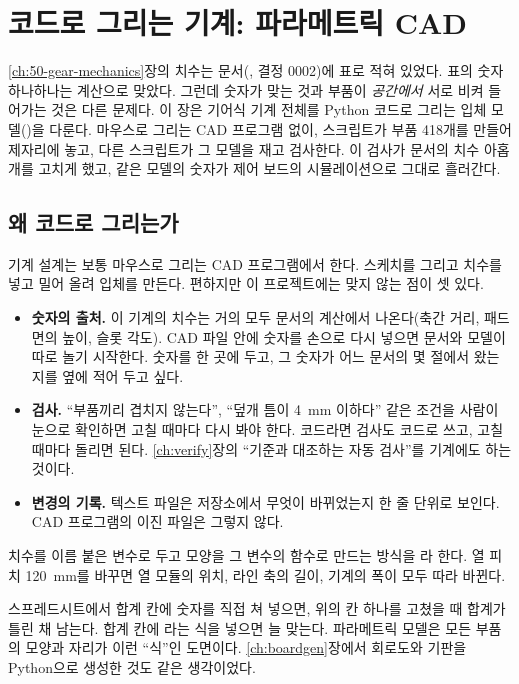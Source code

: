 \chapter{코드로 그리는 기계: 파라메트릭 CAD}\label{ch:51-gear-cad}

\ref{ch:50-gear-mechanics}장의 치수는 문서(, 결정 0002)에 표로 적혀 있었다. 표의 숫자 하나하나는 계산으로
맞았다. 그런데 숫자가 맞는 것과 부품이 \emph{공간에서} 서로 비켜 들어가는 것은 다른 문제다. 이 장은 기어식 기계 전체를
Python 코드로 그리는 입체 모델()을 다룬다. 마우스로 그리는 CAD 프로그램 없이, 스크립트가 부품
418개를 만들어 제자리에 놓고, 다른 스크립트가 그 모델을 재고 검사한다. 이 검사가 문서의 치수 아홉 개를 고치게 했고,
같은 모델의 숫자가 제어 보드의 시뮬레이션으로 그대로 흘러간다.

\section{왜 코드로 그리는가}\label{sec:gc-why}

\Why 기계 설계는 보통 마우스로 그리는 CAD 프로그램에서 한다. 스케치를 그리고 치수를 넣고 밀어 올려 입체를 만든다.
편하지만 이 프로젝트에는 맞지 않는 점이 셋 있다.

\begin{itemize}
\item \textbf{숫자의 출처.} 이 기계의 치수는 거의 모두 문서의 계산에서 나온다(축간 거리, 패드 면의 높이, 슬롯 각도).
CAD 파일 안에 숫자를 손으로 다시 넣으면 문서와 모델이 따로 놀기 시작한다. 숫자를 한 곳에 두고, 그 숫자가 어느 문서의
몇 절에서 왔는지를 옆에 적어 두고 싶다.
\item \textbf{검사.} ``부품끼리 겹치지 않는다'', ``덮개 틈이 4~mm 이하다'' 같은 조건을 사람이 눈으로 확인하면 고칠 때마다
다시 봐야 한다. 코드라면 검사도 코드로 쓰고, 고칠 때마다 돌리면 된다. \ref{ch:verify}장의 ``기준과 대조하는 자동
검사''를 기계에도 하는 것이다.
\item \textbf{변경의 기록.} 텍스트 파일은 저장소에서 무엇이 바뀌었는지 한 줄 단위로 보인다. CAD 프로그램의 이진 파일은
그렇지 않다.
\end{itemize}

치수를 이름 붙은 변수로 두고 모양을 그 변수의 함수로 만드는 방식을 라 한다.
열 피치 120~mm를 바꾸면 열 모듈의 위치, 라인 축의 길이, 기계의 폭이 모두 따라 바뀐다.

\General 스프레드시트에서 합계 칸에 숫자를 직접 쳐 넣으면, 위의 칸 하나를 고쳤을 때 합계가 틀린 채 남는다. 합계 칸에
라는 식을 넣으면 늘 맞는다. 파라메트릭 모델은 모든 부품의 모양과 자리가 이런 ``식''인 도면이다.
\ref{ch:boardgen}장에서 회로도와 기판을 Python으로 생성한 것도 같은 생각이었다.

